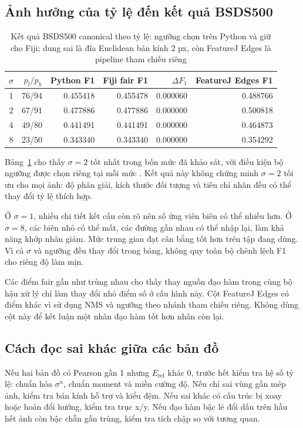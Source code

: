 \subsection{Ảnh hưởng của tỷ lệ đến kết quả BSDS500}
\begin{table}[t]
\centering
\caption{Kết quả BSDS500 canonical theo tỷ lệ: ngưỡng chọn trên Python và giữ cho Fiji; dung sai là đĩa Euclidean bán kính 2 px, còn FeatureJ Edges là pipeline tham chiếu riêng}
\begin{tabular}{crrrrr}
\toprule
$\sigma$ & $p_l/p_h$ & Python F1 & Fiji fair F1 & $\Delta F_1$ & FeatureJ Edges F1\\
\midrule
1 & 76/94 & 0.455418 & 0.455478 & 0.000060 & 0.488766\\
2 & 67/91 & 0.477886 & 0.477886 & 0.000000 & 0.500818\\
4 & 49/80 & 0.441491 & 0.441491 & 0.000000 & 0.464873\\
8 & 23/50 & 0.343340 & 0.343340 & 0.000000 & 0.354292\\
\bottomrule
\end{tabular}
\label{tab:bsds_scales_detailed}
\end{table}
Bảng~\ref{tab:bsds_scales_detailed} cho thấy $\sigma=2$ tốt nhất trong bốn mức đã khảo sát, với điều kiện bộ ngưỡng được chọn riêng tại mỗi mức \cite{xlaRepository}. Kết quả này không chứng minh $\sigma=2$ tối ưu cho mọi ảnh: độ phân giải, kích thước đối tượng và tiêu chí nhãn đều có thể thay đổi tỷ lệ thích hợp.

Ở $\sigma=1$, nhiều chi tiết kết cấu còn rõ nên số ứng viên biên có thể nhiều hơn. Ở $\sigma=8$, các biên nhỏ có thể mất, các đường gần nhau có thể nhập lại, làm khả năng khớp nhãn giảm. Mức trung gian đạt cân bằng tốt hơn trên tập đang dùng. Vì cả $\sigma$ và ngưỡng đều thay đổi trong bảng, không quy toàn bộ chênh lệch F1 cho riêng độ làm mịn.

Các điểm fair gần như trùng nhau cho thấy thay nguồn đạo hàm trong cùng bộ hậu xử lý chỉ làm thay đổi nhỏ điểm số ở cấu hình này. Cột FeatureJ Edges có điểm khác vì sử dụng NMS và ngưỡng theo nhánh tham chiếu riêng. Không dùng cột này để kết luận một nhân đạo hàm tốt hơn nhân còn lại.

\subsection{Cách đọc sai khác giữa các bản đồ}
Nếu hai bản đồ có Pearson gần 1 nhưng $E_{\mathrm{rel}}$ khác 0, trước hết kiểm tra hệ số tỷ lệ: chuẩn hóa $\sigma^n$, chuẩn moment và miền cường độ. Nếu chỉ sai vùng gần mép ảnh, kiểm tra bán kính hỗ trợ và kiểu đệm. Nếu sai khác có cấu trúc bị xoay hoặc hoán đổi hướng, kiểm tra trục x/y. Nếu đạo hàm bậc lẻ đổi dấu trên hầu hết ảnh còn bậc chẵn gần trùng, kiểm tra tích chập so với tương quan.

